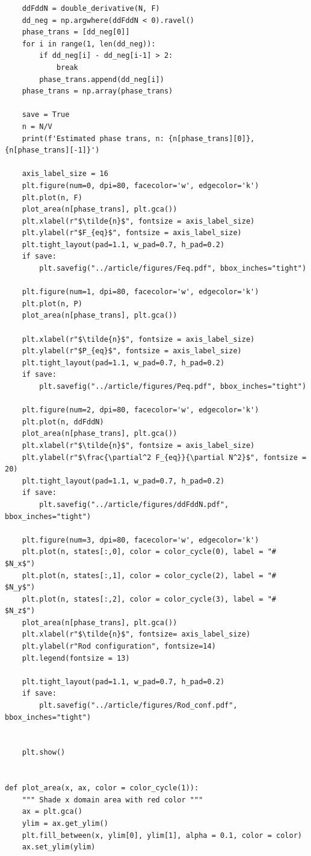 \documentclass[reprint, amsmath, amssymb, aps, onecolumn]{revtex4-2}
\begin{document}
\begin{verbatim}
    ddFddN = double_derivative(N, F)
    dd_neg = np.argwhere(ddFddN < 0).ravel()
    phase_trans = [dd_neg[0]]
    for i in range(1, len(dd_neg)):
        if dd_neg[i] - dd_neg[i-1] > 2:
            break
        phase_trans.append(dd_neg[i])
    phase_trans = np.array(phase_trans)

    save = True
    n = N/V
    print(f'Estimated phase trans, n: {n[phase_trans][0]}, {n[phase_trans][-1]}')

    axis_label_size = 16
    plt.figure(num=0, dpi=80, facecolor='w', edgecolor='k')
    plt.plot(n, F)
    plot_area(n[phase_trans], plt.gca())
    plt.xlabel(r"$\tilde{n}$", fontsize = axis_label_size)
    plt.ylabel(r"$F_{eq}$", fontsize = axis_label_size)
    plt.tight_layout(pad=1.1, w_pad=0.7, h_pad=0.2)
    if save:
        plt.savefig("../article/figures/Feq.pdf", bbox_inches="tight")

    plt.figure(num=1, dpi=80, facecolor='w', edgecolor='k')
    plt.plot(n, P)
    plot_area(n[phase_trans], plt.gca())

    plt.xlabel(r"$\tilde{n}$", fontsize = axis_label_size)
    plt.ylabel(r"$P_{eq}$", fontsize = axis_label_size)
    plt.tight_layout(pad=1.1, w_pad=0.7, h_pad=0.2)
    if save:
        plt.savefig("../article/figures/Peq.pdf", bbox_inches="tight")

    plt.figure(num=2, dpi=80, facecolor='w', edgecolor='k')
    plt.plot(n, ddFddN)
    plot_area(n[phase_trans], plt.gca())
    plt.xlabel(r"$\tilde{n}$", fontsize = axis_label_size)
    plt.ylabel(r"$\frac{\partial^2 F_{eq}}{\partial N^2}$", fontsize = 20)
    plt.tight_layout(pad=1.1, w_pad=0.7, h_pad=0.2)
    if save:
        plt.savefig("../article/figures/ddFddN.pdf", bbox_inches="tight")

    plt.figure(num=3, dpi=80, facecolor='w', edgecolor='k')
    plt.plot(n, states[:,0], color = color_cycle(0), label = "# $N_x$")
    plt.plot(n, states[:,1], color = color_cycle(2), label = "# $N_y$")
    plt.plot(n, states[:,2], color = color_cycle(3), label = "# $N_z$")
    plot_area(n[phase_trans], plt.gca())
    plt.xlabel(r"$\tilde{n}$", fontsize= axis_label_size)
    plt.ylabel(r"Rod configuration", fontsize=14)
    plt.legend(fontsize = 13)

    plt.tight_layout(pad=1.1, w_pad=0.7, h_pad=0.2)
    if save:
        plt.savefig("../article/figures/Rod_conf.pdf", bbox_inches="tight")


    plt.show()


def plot_area(x, ax, color = color_cycle(1)):
    """ Shade x domain area with red color """
    ax = plt.gca()
    ylim = ax.get_ylim()
    plt.fill_between(x, ylim[0], ylim[1], alpha = 0.1, color = color)
    ax.set_ylim(ylim)


\end{verbatim}
\end{document}
